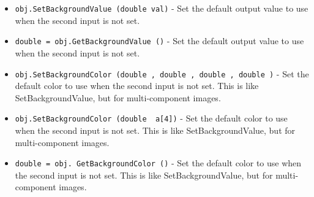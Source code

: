 \begin{itemize}
\item  \verb|obj.SetBackgroundValue (double val)| -  Set the default output value to use when the second input is not set.

\item  \verb|double = obj.GetBackgroundValue ()| -  Set the default output value to use when the second input is not set.

\item  \verb|obj.SetBackgroundColor (double , double , double , double )| -  Set the default color to use when the second input is not set.
 This is like SetBackgroundValue, but for multi-component images.

\item  \verb|obj.SetBackgroundColor (double  a[4])| -  Set the default color to use when the second input is not set.
 This is like SetBackgroundValue, but for multi-component images.

\item  \verb|double = obj. GetBackgroundColor ()| -  Set the default color to use when the second input is not set.
 This is like SetBackgroundValue, but for multi-component images.

\end{itemize}
